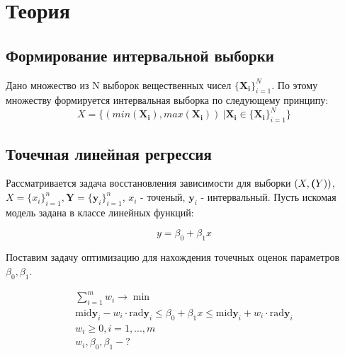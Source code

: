 \documentclass[12pt,a4paper]{article}
\begin{document}
	\section{Теория}
            \subsection{Формирование интервальной выборки}
                Дано множество из N выборок вещественных чисел $\mathbf{\{X_i\}}_{i=1}^N$. По этому множеству формируется интервальная выборка по следующему принципу:
                \begin{equation}
                    X = \{(min(\mathbf{X_i}), max(\mathbf{X_i}))\ | \mathbf{X_i} \in \mathbf{\{X_i\}}_{i=1}^N \}
                \end{equation}
                
            \subsection{Точечная линейная регрессия}
                Рассматривается задача восстановления зависимости для выборки
                $ (X, \textbf(Y))$, $ X = \{x_i\}_{i=1}^{n}, \textbf{Y} = \{\textbf{y}_i\}_{i=1}^{n} $,
                $ x_i $ - точеный, $ \textbf{y}_i $ - интервальный.
                Пусть искомая модель задана в классе линейных функций:
            
                \begin{equation}
                    y = \beta_0 + \beta_1 x
                \end{equation}
            
                Поставим задачу оптимизацию для нахождения точечных оценок
                параметров $ \beta_0, \beta_1 $.
            
                \begin{equation}
                    \begin{gathered}
                        \sum_{i = 1}^{m}w_{i} \to \min \\
                        \text{mid}\textbf{y}_{i} - w_{i} \cdot \text{rad}\textbf{y}_{i} \leq \beta_0 + \beta_1 x \leq \text{mid}\textbf{y}_{i} + w_{i} \cdot \text{rad}\textbf{y}_{i} \\
                        w_{i} \geq 0, i = 1, ..., m \\
                        {w_i}, \beta_0, \beta_1 - ?
                    \end{gathered}
                    \label{e:task}
                \end{equation}
                
\end{document}
